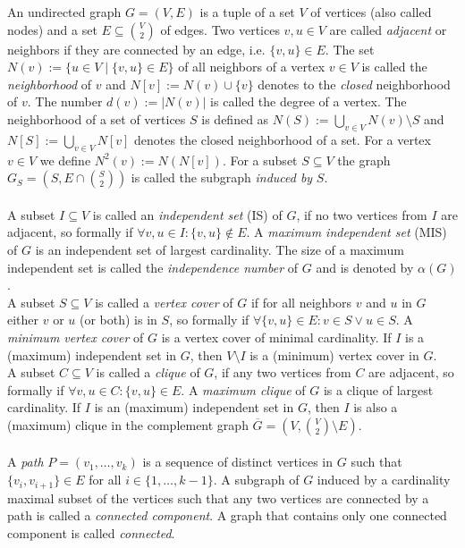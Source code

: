 \documentclass[]{article}
\begin{document}
An undirected graph $G=(V,E)$ is a tuple of a set $V$ of vertices (also called nodes) and a set $E\subseteq \binom{V}{2}$ of edges. Two vertices $v,u\in V$ are called \textit{adjacent} or neighbors if they are connected by an edge, i.e. $\{v,u\}\in E$. The set $N(v) := \{u \in V\;|\; \{v,u\}\in E \}$ of all neighbors of a vertex $v\in V$ is called the \textit{neighborhood} of $v$ and $N[v] := N(v) \cup \{v\}$ denotes to the \textit{closed} neighborhood of $v$. The number $d(v):=|N(v)|$ is called the degree of a vertex. The neighborhood of a set of vertices $S$ is defined as $N(S) := \bigcup_{v\in V}N(v)\setminus S$ and $N[S] := \bigcup_{v\in V}N[v]$ denotes the closed neighborhood of a set. For a vertex $v\in V$ we define $N^2(v) := N(N[v])$. For a subset $S\subseteq V$ the graph $G_S=(S, E\cap\binom{S}{2})$ is called the subgraph \textit{induced by} $S$.\paragraph{}
A subset $I\subseteq V$ is called an \emph{independent set} (IS) of $G$, if no two vertices from $I$ are adjacent, so formally if $\forall v,u\in I: \{v,u\}\notin E$. A \emph{maximum independent set} (MIS) of $G$ is an independent set of largest cardinality. The size of a maximum independent set is called the \emph{independence number} of $G$ and is denoted by $\alpha(G)$. \\
A subset $S\subseteq V$ is called a \emph{vertex cover} of $G$ if for all neighbors $v$ and $u$ in $G$ either $v$ or $u$ (or both) is in $S$, so formally if $\forall \{v,u\}\in E: v\in S \vee u\in S$. A \emph{minimum vertex cover} of $G$ is a vertex cover of minimal cardinality. If $I$ is a (maximum) independent set in $G$, then $V\setminus I$ is a (minimum) vertex cover in $G$.\\
A subset $C\subseteq V$ is called a \emph{clique} of $G$, if any two vertices from $C$ are adjacent, so formally if $\forall v,u\in C:\{v,u\}\in E$. A \emph{maximum clique} of $G$ is a clique of largest cardinality. If $I$ is an (maximum) independent set in $G$, then $I$ is also a (maximum) clique in the complement graph $\overline{G}=(V, \binom{V}{2}\setminus E)$.\paragraph{}
A \textit{path} $P=(v_1,\dots,v_k)$ is a sequence of distinct vertices in $G$ such that $\{v_i,v_{i+1}\}\in E$ for all $i \in \{1,\dots,k-1\}$. A subgraph of $G$ induced by a cardinality maximal subset of the vertices such that any two vertices are connected by a path is called a \textit{connected component}. A graph that contains only one connected component is called \textit{connected}. \paragraph{}
\end{document}
